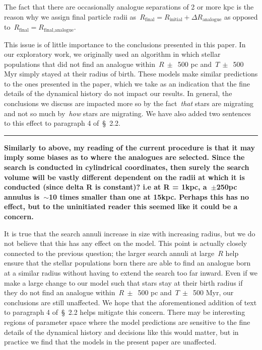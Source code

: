 \documentclass{report}
\newcommand{\breakline}{\noindent\rule{\textwidth}{1pt}}
\begin{document}
The fact that there are occasionally analogue separations of 2 or more kpc is 
the reason why we assign final particle radii as~$R_\text{final} = 
R_\text{initial} + \Delta R_\text{analogue}$ as opposed 
to~$R_\text{final} = R_\text{final,analogue}$. 
\par 
This issue is of little importance to the conclusions presented in this paper. 
In our exploratory work, we originally used an algorithm in which stellar 
populations that did not find an analogue within~$R~\pm$~500 pc and~$T~\pm$~500 
Myr simply stayed at their radius of birth. 
These models make similar predictions to the ones presented in the paper, which 
we take as an indication that the fine details of the dynamical history do 
not impact our results. 
In general, the conclusions we discuss are impacted more so by the 
fact~\textit{that} stars are migrating and not so much by~\textit{how} stars 
are migrating. We have also added two sentences to this effect to paragraph 4 
of~\S~2.2. 

\par\null\par 
\breakline 
\par\null\par 
\textbf{
	Similarly to above, my reading of the current procedure is that it may 
	imply some biases as to where the analogues are selected. 
	Since the search is conducted in cylindrical coordinates, then surely the 
	search volume will be vastly different dependent on the radii at which it 
	is conducted (since delta R is constant)? 
	i.e at R = 1kpc, a~$\pm$250pc annulus is~$\sim$10 times smaller than one at 
	15kpc. 
	Perhaps this has no effect, but to the uninitiated reader this seemed like 
	it could be a concern.
} 
\par 
It is true that the search annuli increase in size with increasing radius, but 
we do not believe that this has any effect on the model. 
This point is actually closely connected to the previous question; the larger 
search annuli at large~$R$ help ensure that the stellar populations born there 
are able to find an analogue born at a similar radius without having to extend 
the search too far inward. 
Even if we make a large change to our model such that stars stay at their 
birth radius if they do not find an analogue within~$R~\pm$~500 pc 
and~$T~\pm$~500 Myr, our conclusions are still unaffected. 
We hope that the aforementioned addition of text to paragraph 4 of~\S~2.2 
helps mitigate this concern. 
There may be interesting regions of parameter space where the model predictions 
are sensitive to the fine details of the dynamical history and decisions like 
this would matter, but in practice we find that the models in the present paper 
are unaffected. 
\end{document}
